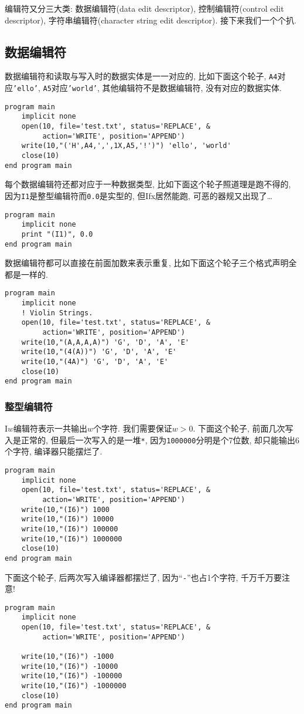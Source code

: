 编辑符又分三大类: 数据编辑符(data edit descriptor), 控制编辑符(control edit descriptor), 字符串编辑符(character string edit descriptor). 接下来我们一个个扒.

\subsection{数据编辑符}

数据编辑符和读取与写入时的数据实体是一一对应的, 比如下面这个轮子, \texttt{A4}对应\texttt{'ello'}, \texttt{A5}对应\texttt{'world'}, 其他编辑符不是数据编辑符, 没有对应的数据实体.
\begin{lstlisting}
program main
    implicit none
    open(10, file='test.txt', status='REPLACE', &
         action='WRITE', position='APPEND')
    write(10,"('H',A4,',',1X,A5,'!')") 'ello', 'world'
    close(10)
end program main
\end{lstlisting}
每个数据编辑符还都对应于一种数据类型, 比如下面这个轮子照道理是跑不得的, 因为\texttt{I1}是整型编辑符而\texttt{0.0}是实型的, 但Ifx居然能跑, 可恶的器规又出现了\dots
\begin{lstlisting}
program main
    implicit none
    print "(I1)", 0.0
end program main
\end{lstlisting}

数据编辑符都可以直接在前面加数来表示重复, 比如下面这个轮子三个格式声明全都是一样的.
\begin{lstlisting}
program main
    implicit none
    ! Violin Strings.
    open(10, file='test.txt', status='REPLACE', &
         action='WRITE', position='APPEND')
    write(10,"(A,A,A,A)") 'G', 'D', 'A', 'E'
    write(10,"(4(A))") 'G', 'D', 'A', 'E'
    write(10,"(4A)") 'G', 'D', 'A', 'E'
    close(10)
end program main
\end{lstlisting}

\subsubsection{整型编辑符}

I$w$编辑符表示一共输出$w$个字符. 我们需要保证$w>0$. 下面这个轮子, 前面几次写入是正常的, 但最后一次写入的是一堆\texttt{*}, 因为\texttt{1000000}分明是个7位数, 却只能输出6个字符, 编译器只能摆烂了.
\begin{lstlisting}
program main
    implicit none
    open(10, file='test.txt', status='REPLACE', &
         action='WRITE', position='APPEND')
    write(10,"(I6)") 1000
    write(10,"(I6)") 10000
    write(10,"(I6)") 100000
    write(10,"(I6)") 1000000
    close(10)
end program main
\end{lstlisting}
下面这个轮子, 后两次写入编译器都摆烂了, 因为``\texttt{-}''也占1个字符, 千万千万要注意!
\begin{lstlisting}
program main
    implicit none
    open(10, file='test.txt', status='REPLACE', &
         action='WRITE', position='APPEND')

    write(10,"(I6)") -1000
    write(10,"(I6)") -10000
    write(10,"(I6)") -100000
    write(10,"(I6)") -1000000
    close(10)
end program main
\end{lstlisting}

